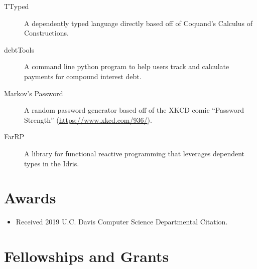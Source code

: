 \documentclass[11pt,a4paper]{moderncv}
\begin{document}
\begin{description}
    \item[TTyped] A dependently typed language directly based off of
        Coquand's Calculus of Constructions.

    \item[debtTools] A command line python program to help users track
        and calculate payments for compound interest debt.
%
    \item[Markov's Password] A random password generator based off of
        the XKCD comic ``Password Strength''
        (\url{https://www.xkcd.com/936/}).
%
    \item[FarRP] A library for functional reactive programming that
        leverages dependent types in the Idris.
\end{description}


\section*{Awards}

\begin{itemize}
    \item Received 2019 U.C. Davis Computer Science Departmental Citation.
\end{itemize}

\section*{Fellowships and Grants}
\end{document}
